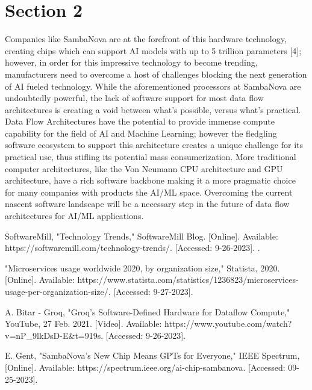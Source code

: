 \documentclass[11pt]{IEEEtran}
\begin{document}
\section{Section 2}
Companies like SambaNova are at the forefront of this hardware technology, creating chips which can support AI models with up to 5 trillion parameters [4]; however, in order for this impressive technology to become trending, manufacturers need to overcome a host of challenges blocking the next generation of AI fueled technology.  While the aforementioned processors at SambaNova are undoubtedly powerful, the lack of software support for most data flow architectures is creating a void between what's possible, versus what's practical.  Data Flow Architectures have the potential to provide immense compute capability for the field of AI and Machine Learning; however the fledgling software ecosystem to support this architecture creates a unique challenge for its practical use, thus stifling its potential mass consumerization.  More traditional computer architectures, like the Von Neumann CPU architecture and GPU architecture, have a rich software backbone making it a more pragmatic choice for many companies with products the AI/ML space.  Overcoming the current nascent software landscape will be a necessary step in the future of data flow architectures for AI/ML applications. 

\begin{thebibliography}{00}

 SoftwareMill, "Technology Trends," SoftwareMill Blog. [Online]. Available: https://softwaremill.com/technology-trends/. [Accessed: 9-26-2023].
.

 "Microservices usage worldwide 2020, by organization size," Statista, 2020. [Online]. Available: https://www.statista.com/statistics/1236823/microservices-usage-per-organization-size/. [Accessed: 9-27-2023].


 A. Bitar - Groq, "Groq’s Software-Defined Hardware for Dataflow Compute," YouTube, 27 Feb. 2021. [Video]. Available: https://www.youtube.com/watch?v=nP\_9lkDsD-E\&t=919s. [Accessed: 9-26-2023].

 E. Gent, "SambaNova’s New Chip Means GPTs for Everyone," IEEE Spectrum, [Online]. Available: https://spectrum.ieee.org/ai-chip-sambanova. [Accessed: 09-25-2023].



\end{thebibliography}
\end{document}
